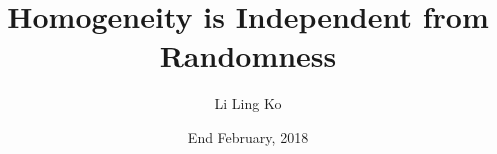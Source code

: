 \documentclass[notes]{beamer}
\title{Homogeneity is Independent from Randomness}
\author{Li Ling Ko}
\institute{University of Notre Dame}
\date{End February, 2018}
\begin{document}
\begin{frame}
  \titlepage
\end{frame}




\end{document}
